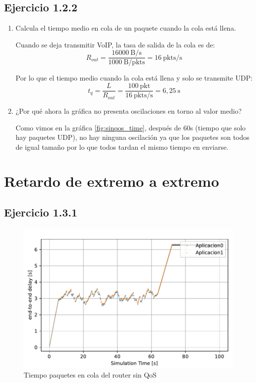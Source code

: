 \subsection{Ejercicio 1.2.2}
\begin{enumerate}
    
    \item Calcula el tiempo medio en cola de un paquete cuando la cola está llena.
    
    Cuando se deja transmitir VoIP, la tasa de salida de la cola es de:
    \[
      R_{out} = \frac{16000~\text{B/s}}{1000~\text{B/pkts}} = 16~\text{pkts/s}
    \]

    Por lo que el tiempo medio cuando la cola está llena y solo se transmite UDP:
    \[
      t_{q} = \frac{L}{R_{out}} = \frac{100~\mathrm{pkt}}{16~\mathrm{pkts/s}} = 6,25~\mathrm{s}
    \]

    \item ¿Por qué ahora la gráfica no presenta oscilaciones en torno al valor medio?
    
    Como vimos en la gráfica \ref{fig:sinqos_time}, después de 60s (tiempo que solo hay paquetes UDP), no hay ninguna oscilación
    ya que los paquetes son todos de igual tamaño por lo que todos tardan el mismo tiempo en enviarse.
  

\end{enumerate}


\section{Retardo de extremo a extremo}

\subsection{Ejercicio 1.3.1}

\begin{figure}[!ht]
    \centering
    \includegraphics{graficas/sinQoS/ end_to_end__delay_sinQoS.pdf}
    \caption{Tiempo paquetes en cola del router sin QoS}
    \label{fig:sinqos_endtoend}
\end{figure}

